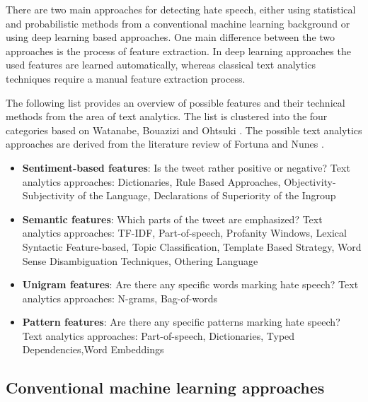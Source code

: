 There are two main approaches for detecting hate speech, either using sta\-tis\-ti\-cal and probabilistic methods from a conventional machine learning back\-ground or using deep learning based approaches. One main difference between the two approaches is the process of feature extraction. In deep learning approaches the used features are learned automatically, whereas classical text analytics techniques require a manual feature extraction process.

The following list provides an overview of possible features and their technical methods from the area of text analytics. The list is clustered into the four categories based on Watanabe, Bouazizi and Ohtsuki \cite{Watanabe.2018}. The possible text analytics approaches are derived from the literature review of Fortuna and Nunes \cite{Fortuna.2018}.
\begin{itemize}
	\item \textbf{Sentiment-based features}: Is the tweet rather positive or negative? \newline
	Text analytics approaches: Dictionaries, Rule Based Approaches, Ob\-jec\-ti\-vi\-ty-Subjectivity of the Language, Declarations of Superiority of the Ingroup \cite{Fortuna.2018}
	\item \textbf{Semantic features}: Which parts of the tweet are emphasized? \newline
	Text analytics approaches: TF-IDF, Part-of-speech, Profanity Windows, Lexical Syntactic Feature-based, Topic Classification, Template Based Strategy, Word Sense Disambiguation Techniques, Othering Language \cite{Fortuna.2018}
	\item \textbf{Unigram features}: Are there any specific words marking hate speech? \newline
	Text analytics approaches: N-grams, Bag-of-words \cite{Fortuna.2018}
	\item \textbf{Pattern features}: Are there any specific patterns marking hate speech? \newline
	Text analytics approaches: Part-of-speech, Dictionaries, Typed De\-pen\-den\-cies,Word Embeddings \cite{Fortuna.2018}
\end{itemize}


\subsection{Conventional machine learning approaches}

